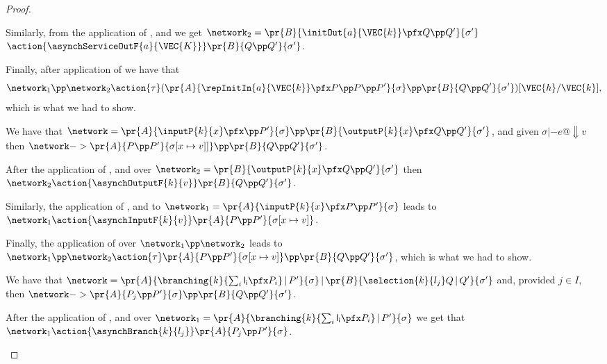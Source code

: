 \begin{proposition}
\begin{proof}
\begin{description}
\begin{description}
     Similarly, from the application of ,  and  we get
     $\network_2 =  \pr{B}{\initOut{a}{\VEC{k}} \pfx Q \pp
       Q'}{\sigma'}$ $
     \action{\asynchServiceOutF{a}{\VEC{K}}} \pr{B}{ Q \pp
       Q'}{\sigma'} $.

     Finally, after application of  we have that
      \[ \network_1 \pp \network_2 \action{\tau}
     (\pr{A}{\repInitIn{a}{\VEC{k}} \pfx P \pp P \pp P'
       }{\sigma} \pp \pr{B}{Q \pp
       Q'}{\sigma'})[\VEC{h}/ \VEC{k}], \] which is what we had to show.
 
     \item[Case \Did{E-RCom}:] We have that $\network =
       \pr{A}{\inputP{k}{x} \pfx \pp P'}{\sigma} \pp
       \pr{B}{\outputP{k}{x} \pfx Q \pp Q'}{\sigma'}$, and given
       $\sigma |- e@\Downarrow v$ then $\network -> \pr{A}{P \pp P'}{\sigma[x
         \mapsto v]]} \pp \pr{B}{Q \pp Q'}{\sigma'}$.

       After the application of ,  and
        over $\network_2 = \pr{B}{\outputP{k}{x} \pfx Q
         \pp Q'}{\sigma'}$ then $\network_2
       \action{\asynchOutputF{k}{v}} \pr{B}{ Q
         \pp Q'}{\sigma'}$.

       Similarly, the application of , and
        to $\network_1 = \pr{A}{\inputP{k}{x} \pfx P \pp
         P'}{\sigma} $ leads to $\network_1
       \action{\asynchInputF{k}{v}} \pr{A}{P \pp
         P'}{\sigma[x \mapsto v]}$.

       Finally, the application of  over $\network_1 \pp
       \network_2$ leads to $\network_1 \pp \network_2 \action{\tau}
       \pr{A}{P \pp P'}{\sigma[x \mapsto v]} \pp \pr{B}{ Q \pp
         Q'}{\sigma'}$, which is what we had to show.
       
       \item[Case \Did{E-RSel}:] We have that $\network =  \pr{A}{
           \branching{k}{\sum_i \mathsf{l_i} \pfx P_i} \,|\,
           P'}{\sigma} \,|\, \pr{B}{\selection{k}{l_j} Q \,|\,
           Q'}{\sigma'}$ and, provided $j \in I$, then $\network ->
         \pr{A}{P_j\pp P'}{\sigma}  \pp   \pr{B}{Q\pp Q'}{\sigma'} $.

         After the application of ,  and
          over $\network_1 = \pr{A}{
           \branching{k}{\sum_i \mathsf{l_i} \pfx P_i} \,|\,
           P'}{\sigma}$ we get that $\network_1
         \action{\asynchBranch{k}{l_j}} \pr{A}{P_j \pp P'}{\sigma}$.


\end{description}
\end{description}
\end{proof}
\end{proposition}
